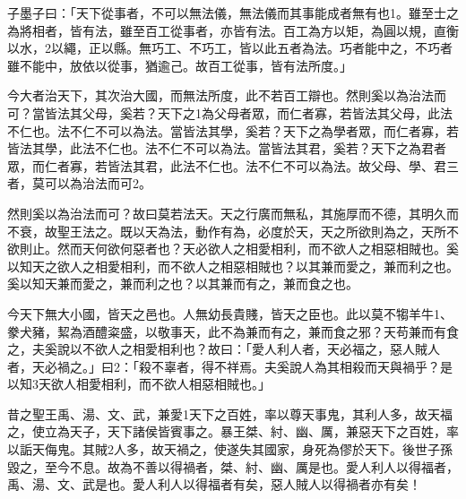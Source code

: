 
\begin{pinyinscope}
子墨子曰：「天下從事者，不可以無法儀，無法儀而其事能成者無有也1。雖至士之為將相者，皆有法，雖至百工從事者，亦皆有法。百工為方以矩，為圓以規，直衡以水，2以繩，正以縣。無巧工、不巧工，皆以此五者為法。巧者能中之，不巧者雖不能中，放依以從事，猶逾己。故百工從事，皆有法所度。」

今大者治天下，其次治大國，而無法所度，此不若百工辯也。然則奚以為治法而可？當皆法其父母，奚若？天下之1為父母者眾，而仁者寡，若皆法其父母，此法不仁也。法不仁不可以為法。當皆法其學，奚若？天下之為學者眾，而仁者寡，若皆法其學，此法不仁也。法不仁不可以為法。當皆法其君，奚若？天下之為君者眾，而仁者寡，若皆法其君，此法不仁也。法不仁不可以為法。故父母、學、君三者，莫可以為治法而可2。

然則奚以為治法而可？故曰莫若法天。天之行廣而無私，其施厚而不德，其明久而不衰，故聖王法之。既以天為法，動作有為，必度於天，天之所欲則為之，天所不欲則止。然而天何欲何惡者也？天必欲人之相愛相利，而不欲人之相惡相賊也。奚以知天之欲人之相愛相利，而不欲人之相惡相賊也？以其兼而愛之，兼而利之也。奚以知天兼而愛之，兼而利之也？以其兼而有之，兼而食之也。

今天下無大小國，皆天之邑也。人無幼長貴賤，皆天之臣也。此以莫不犓羊牛1、豢犬豬，絜為酒醴粢盛，以敬事天，此不為兼而有之，兼而食之邪？天苟兼而有食之，夫奚說以不欲人之相愛相利也？故曰：「愛人利人者，天必福之，惡人賊人者，天必禍之。」曰2：「殺不辜者，得不祥焉。夫奚說人為其相殺而天與禍乎？是以知3天欲人相愛相利，而不欲人相惡相賊也。」

昔之聖王禹、湯、文、武，兼愛1天下之百姓，率以尊天事鬼，其利人多，故天福之，使立為天子，天下諸侯皆賓事之。暴王桀、紂、幽、厲，兼惡天下之百姓，率以詬天侮鬼。其賊2人多，故天禍之，使遂失其國家，身死為僇於天下。後世子孫毀之，至今不息。故為不善以得禍者，桀、紂、幽、厲是也。愛人利人以得福者，禹、湯、文、武是也。愛人利人以得福者有矣，惡人賊人以得禍者亦有矣！


\end{pinyinscope}